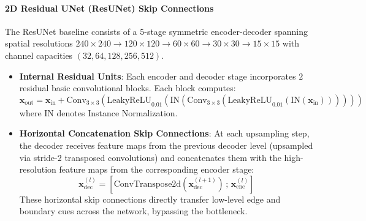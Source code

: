 \documentclass{article}
\begin{document}
\paragraph{2D Residual UNet (ResUNet) Skip Connections}
The ResUNet baseline consists of a 5-stage symmetric encoder-decoder spanning spatial resolutions $240\times240 \to 120\times120 \to 60\times60 \to 30\times30 \to 15\times15$ with channel capacities $(32, 64, 128, 256, 512)$.
\begin{itemize}
    \item \textbf{Internal Residual Units}: Each encoder and decoder stage incorporates $2$ residual basic convolutional blocks. Each block computes:
    \begin{equation}
        \mathbf{x}_{\text{out}} = \mathbf{x}_{\text{in}} + \text{Conv}_{3\times3}\left(\text{LeakyReLU}_{0.01}\left(\text{IN}\left(\text{Conv}_{3\times3}\left(\text{LeakyReLU}_{0.01}\left(\text{IN}(\mathbf{x}_{\text{in}})\right)\right)\right)\right)\right)
    \end{equation}
    where $\text{IN}$ denotes Instance Normalization.
    \item \textbf{Horizontal Concatenation Skip Connections}: At each upsampling step, the decoder receives feature maps from the previous decoder level (upsampled via stride-2 transposed convolutions) and concatenates them with the high-resolution feature maps from the corresponding encoder stage:
    \begin{equation}
        \mathbf{x}_{\text{dec}}^{(l)} = \left[ \text{ConvTranspose2d}(\mathbf{x}_{\text{dec}}^{(l+1)}) \,;\, \mathbf{x}_{\text{enc}}^{(l)} \right]
    \end{equation}
    These horizontal skip connections directly transfer low-level edge and boundary cues across the network, bypassing the bottleneck.
\end{itemize}
\end{document}

